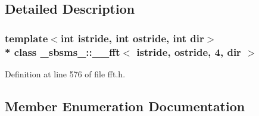 \subsection{Detailed Description}
\subsubsection*{template$<$int istride, int ostride, int dir$>$\\*
class \+\_\+sbsms\+\_\+\+::\+\_\+\+\_\+fft$<$ istride, ostride, 4, dir $>$}



Definition at line 576 of file fft.\+h.



\subsection{Member Enumeration Documentation}
